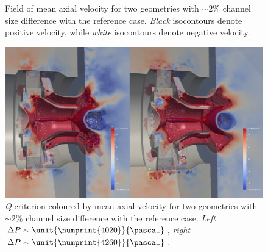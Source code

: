 \begin{figure}[!ht]
\centering
\caption{Field of mean axial velocity for two geometries with $\sim2$\% channel size difference with the reference case. \emph{Black} isocontours denote positive velocity, while \emph{white} isocontours denote negative velocity.}
\label{fig:swirler_mod_u}
\end{figure}

\begin{figure}[!ht]
\centering
\includegraphics[width=\linewidth,keepaspectratio]{fig/applications/swirler/recirculation_base-mod.png}
\caption{\emph{Q}-criterion coloured by mean axial velocity for two geometries with $\sim2$\% channel size difference with the reference case. \emph{Left} $\Delta P \sim \unit{\numprint{4020}}{\pascal}$, \emph{right} $\Delta P \sim \unit{\numprint{4260}}{\pascal}$.}
\label{fig:swirler_mod_u_3d}
\end{figure}

